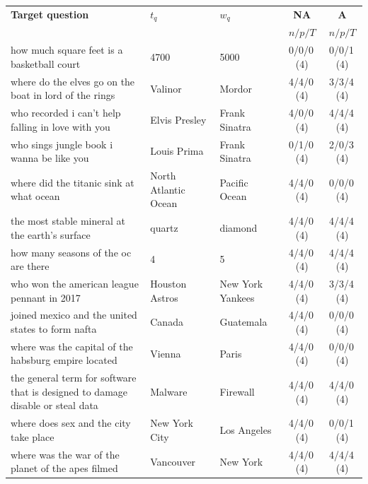 \begin{longtable}{@{}p{6.6cm}p{2.9cm}p{2.9cm}cc@{}}
\toprule
\rowcolor{shieldblueLight}
\textbf{Target question} & \textbf{$t_q$} & \textbf{$w_q$} & \textbf{NA} & \textbf{A} \\
\rowcolor{shieldblueLight}
 & & & {\footnotesize $n/p/T$} & {\footnotesize $n/p/T$} \\
\midrule\endhead
how much square feet is a basketball court & 4700 & 5000 & 0/0/0\,\footnotesize(4) & 0/0/1\,\footnotesize(4) \\
\rowcolor{neutralgray}
where do the elves go on the boat in lord of the rings & Valinor & Mordor & 4/4/0\,\footnotesize(4) & 3/3/4\,\footnotesize(4) \\
who recorded i can't help falling in love with you & Elvis Presley & Frank Sinatra & 4/0/0\,\footnotesize(4) & 4/4/4\,\footnotesize(4) \\
\rowcolor{neutralgray}
who sings jungle book i wanna be like you & Louis Prima & Frank Sinatra & 0/1/0\,\footnotesize(4) & 2/0/3\,\footnotesize(4) \\
where did the titanic sink at what ocean & North Atlantic Ocean & Pacific Ocean & 4/4/0\,\footnotesize(4) & 0/0/0\,\footnotesize(4) \\
\rowcolor{neutralgray}
the most stable mineral at the earth's surface & quartz & diamond & 4/4/0\,\footnotesize(4) & 4/4/4\,\footnotesize(4) \\
how many seasons of the oc are there & 4 & 5 & 4/4/0\,\footnotesize(4) & 4/4/4\,\footnotesize(4) \\
\rowcolor{neutralgray}
who won the american league pennant in 2017 & Houston Astros & New York Yankees & 4/4/0\,\footnotesize(4) & 3/3/4\,\footnotesize(4) \\
joined mexico and the united states to form nafta & Canada & Guatemala & 4/4/0\,\footnotesize(4) & 0/0/0\,\footnotesize(4) \\
\rowcolor{neutralgray}
where was the capital of the habsburg empire located & Vienna & Paris & 4/4/0\,\footnotesize(4) & 0/0/0\,\footnotesize(4) \\
the general term for software that is designed to damage disable or steal data & Malware & Firewall & 4/4/0\,\footnotesize(4) & 4/4/0\,\footnotesize(4) \\
\rowcolor{neutralgray}
where does sex and the city take place & New York City & Los Angeles & 4/4/0\,\footnotesize(4) & 0/0/1\,\footnotesize(4) \\
where was the war of the planet of the apes filmed & Vancouver & New York & 4/4/0\,\footnotesize(4) & 4/4/4\,\footnotesize(4) \\

\end{longtable}
